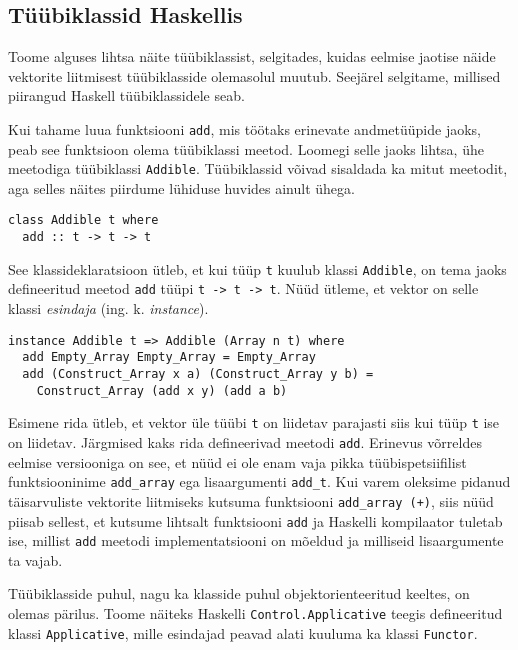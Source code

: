 \documentclass[12pt]{article}
\begin{document}
    \subsection{Tüübiklassid Haskellis}
      Toome alguses lihtsa näite tüübiklassist, selgitades, kuidas eelmise jaotise näide vektorite liitmisest tüübiklasside olemasolul muutub. Seejärel selgitame, millised piirangud Haskell tüübiklassidele seab.

      Kui tahame luua funktsiooni \verb!add!, mis töötaks erinevate andmetüüpide jaoks, peab see funktsioon olema tüübiklassi meetod. Loomegi selle jaoks lihtsa, ühe meetodiga tüübiklassi \verb!Addible!. Tüübiklassid võivad sisaldada ka mitut meetodit, aga selles näites piirdume lühiduse huvides ainult ühega.

      \begin{verbatim}class Addible t where
  add :: t -> t -> t\end{verbatim}

      See klassideklaratsioon ütleb, et kui tüüp \verb!t! kuulub klassi \verb!Addible!, on tema jaoks defineeritud meetod \verb!add! tüüpi \verb!t -> t -> t!. Nüüd ütleme, et vektor on selle klassi \textit{esindaja} (ing. k. \textit{instance}).

      \begin{verbatim}instance Addible t => Addible (Array n t) where
  add Empty_Array Empty_Array = Empty_Array
  add (Construct_Array x a) (Construct_Array y b) =
    Construct_Array (add x y) (add a b)\end{verbatim}

      Esimene rida ütleb, et vektor üle tüübi \verb!t! on liidetav parajasti siis kui tüüp \verb!t! ise on liidetav. Järgmised kaks rida defineerivad meetodi \verb!add!. Erinevus võrreldes eelmise versiooniga on see, et nüüd ei ole enam vaja pikka tüübispetsiifilist funktsiooninime \verb!add_array! ega lisaargumenti \verb!add_t!. Kui varem oleksime pidanud täisarvuliste vektorite liitmiseks kutsuma funktsiooni \verb!add_array (+)!, siis nüüd piisab sellest, et kutsume lihtsalt funktsiooni \verb!add! ja Haskelli kompilaator tuletab ise, millist \verb!add! meetodi implementatsiooni on mõeldud ja milliseid lisaargumente ta vajab.

      Tüübiklasside puhul, nagu ka klasside puhul objektorienteeritud keeltes, on olemas pärilus. Toome näiteks Haskelli \verb!Control.Applicative! teegis defineeritud klassi \verb!Applicative!, mille esindajad peavad alati kuuluma ka klassi \verb!Functor!.
\end{document}
